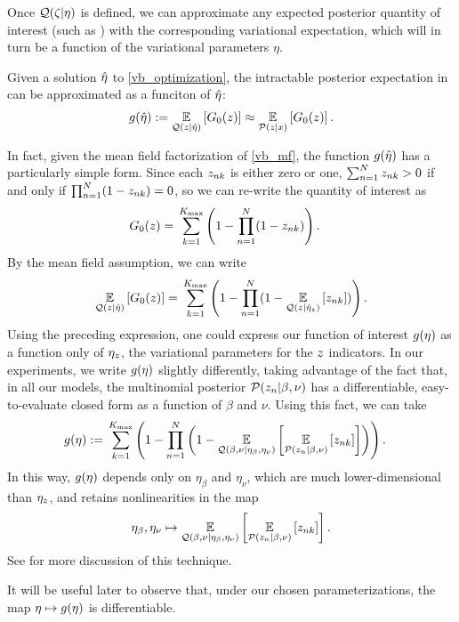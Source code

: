 Once $\mathcal{Q}(\zeta \vert \eta)$ is defined,
we can approximate any expected posterior quantity of interest
(such as ) with the
corresponding variational expectation, which will
in turn be a function of the variational parameters $\eta$.

\begin{ex}
%
Given a solution $\hat\eta$ to \eqref{vb_optimization}, the intractable posterior
expectation in  can be approximated as
a funciton of $\hat\eta$:
%
\begin{align*}
%
\g(\etaopt) :={}
    \expect{\q(\z\vert\etaopt)}{\nclusters_0(\z)} \approx
    \expect{\p(\z\vert\x)}{\nclusters_0(\z)}.
%
\end{align*}

In fact, given the mean field factorization of \eqref{vb_mf}, the function
$g(\hat\eta)$ has a particularly simple form.  Since each $z_{nk}$ is either
zero or one, $\sum_{n=1}^N z_{nk} > 0$ if and only if $\prod_{n=1}^N (1 -
z_{nk}) = 0$, so we can re-write the quantity of interest as
%
\begin{align*}
%
\nclusters_0(\z) ={}&
    \sumk \left(1 -  \prod_{\n=1}^\N (1 - \z_{\n\k})\right).
%
\end{align*}
%
By the mean field assumption, we can write
%
\begin{align*}
%
\expect{\q(\z \vert \etaopt)}{\nclusters_0(\z)} ={}
    \sumk \left(1 -  \prod_{\n=1}^\N
        (1 - \expect{\q(\z \vert \etaoptz)}{\z_{\n\k}})\right).
%
\end{align*}
%
Using the preceding expression, one could express our function of interest
$g(\eta)$ as a function only of $\eta_z$, the variational parameters for the
$z$ indicators.  In our experiments, we write $g(\eta)$ slightly differently,
taking advantage of the fact that, in all our models, the multinomial posterior
$\mathcal{P}(z_n \vert \beta, \nu)$ has a differentiable, easy-to-evaluate closed form
as a function of $\beta$ and $\nu$. Using this fact, we can take
%
\begin{align*}
%
\g(\eta) :={}&
    \sumk \left(1 -  \prod_{\n=1}^\N
        \left(1 - \expect{\q(\beta, \nu \vert \eta_\beta, \eta_\nu)}
                    {\expect{\p(\z_{\n} \vert \beta, \nu)}{\z_{\n\k}}}
                    \right)\right).
%
\end{align*}
%
In this way, $g(\eta)$ depends only on $\eta_\beta$ and $\eta_\nu$, which are
much lower-dimensional than $\eta_z$, and retains nonlinearities in the map
%
\begin{align*}
%
\eta_\beta, \eta_\nu \mapsto \expect{\q(\beta, \nu \vert \eta_\beta,
\eta_\nu)} {\expect{\p(\z_{\n} \vert \beta, \nu)}{\z_{\n\k}}}.
%
\end{align*}
%
See  for more discussion of this technique.

It will be useful later to observe that, under our chosen parameterizations, the
map $\eta \mapsto g(\eta)$ is differentiable.
%
\end{ex}
